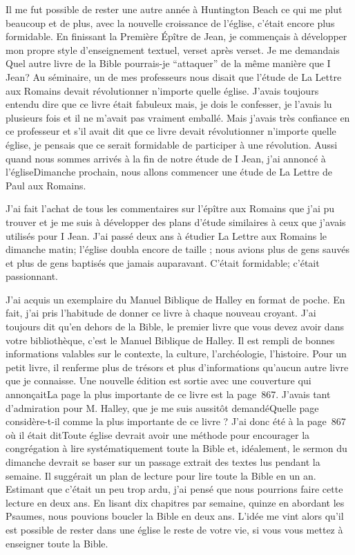 Il me fut possible de rester une autre année à Huntington Beach ce qui me plut beaucoup et de plus, avec la nouvelle
croissance de l’église, c’était encore plus formidable. En finissant la Première Épître de Jean, je commençais à
développer mon propre style d’enseignement textuel, verset après verset. Je me demandais \og Quel autre livre de la
Bible pourrais-je ``attaquer'' de la même manière que I Jean? \fg{} Au séminaire, un de mes professeurs nous disait que
l'étude de La Lettre aux Romains devait révolutionner n’importe quelle église. J’avais toujours entendu dire que ce
livre était fabuleux mais, je dois le confesser, je l’avais lu plusieurs fois et il ne m’avait pas vraiment emballé. Mais
j’avais très confiance en ce professeur et s’il avait dit que ce livre devait révolutionner n’importe quelle église, je
pensais que ce serait formidable de participer à une révolution. Aussi quand nous sommes arrivés à la fin de notre
étude de I Jean, j’ai annoncé à l’église\frcolon\og Dimanche prochain, nous allons commencer une étude de La Lettre de Paul
aux Romains.\fg{}

J'ai fait l’achat de tous les commentaires sur l’épître aux Romains que j'ai pu trouver et je me suis à développer des
plans d’étude similaires à ceux que j’avais utilisés pour I Jean. J'ai passé deux ans à étudier La Lettre aux Romains le
dimanche matin; l’église doubla encore de taille ; nous avions plus de gens sauvés et plus de gens baptisés que
jamais auparavant. C’était formidable; c'était passionnant.

J'ai acquis un exemplaire du Manuel Biblique de Halley en format de poche. En fait, j'ai pris l’habitude de donner ce
livre à chaque nouveau croyant. J’ai toujours dit qu'en dehors de la Bible, le premier livre que vous devez avoir dans
votre bibliothèque, c'est le Manuel Biblique de Halley. Il est rempli de bonnes informations valables sur le contexte, la
culture, l’archéologie, l’histoire. Pour un petit livre, il renferme plus de trésors et plus d'informations qu’aucun autre
livre que je connaisse. Une nouvelle édition est sortie avec une couverture qui annonçait\frcolon\og La page la plus importante
de ce livre est la page~867.\fg{} J'avais tant d'admiration pour M. Halley, que je me suis aussitôt demandé\frcolon\og Quelle page
considère-t-il comme la plus importante de ce livre ?\fg{} J'ai donc été à la page~867 où il était dit\frcolon\og Toute église devrait
avoir une méthode pour encourager la congrégation à lire systématiquement toute la Bible et, idéalement, le sermon
du dimanche devrait se baser sur un passage extrait des textes lus pendant la semaine.\fg{} Il suggérait un plan de
lecture pour lire toute la Bible en un an. Estimant que c’était un peu trop ardu, j'ai pensé que nous pourrions faire
cette lecture en deux ans. En lisant dix chapitres par semaine, quinze en abordant les Psaumes, nous pouvions
boucler la Bible en deux ans. L’idée me vint alors qu’il est possible de rester dans une église le reste de votre vie, si
vous vous mettez à enseigner toute la Bible.

